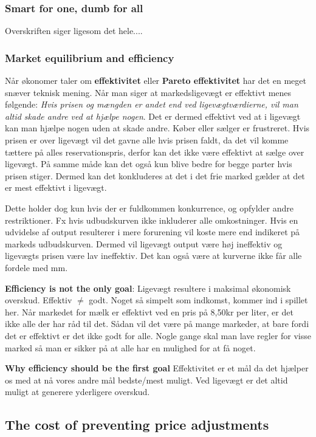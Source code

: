 \subsubsection{Smart for one, dumb for all}
Overskriften siger ligesom det hele....

\subsubsection{Market equilibrium and efficiency}
Når økonomer taler om \textbf{effektivitet} eller \textbf{Pareto effektivitet} har det en meget snæver teknisk mening. Når man siger at markedsligevægt er effektivt menes følgende: \textit{Hvis prisen og mængden er andet end ved ligevægtværdierne, vil man altid skade andre ved at hjælpe nogen}. Det er dermed effektivt ved at i ligevægt kan man hjælpe nogen uden at skade andre. Køber eller sælger er frustreret. Hvis prisen er over ligevægt vil det gavne alle hvis prisen faldt, da det vil komme tættere på alles reservationspris, derfor kan det ikke være effektivt at sælge over ligevægt. På samme måde kan det også kun blive bedre for begge parter hvis prisen stiger. Dermed kan det konkluderes at det i det frie marked gælder at det er mest effektivt i ligevægt. 

Dette holder dog kun hvis der er fuldkommen konkurrence, og opfylder andre restriktioner. Fx hvis udbudskurven ikke inkluderer alle omkostninger. Hvis en udvidelse af output resulterer i mere forurening vil koste mere end indikeret på markeds udbudskurven. Dermed vil ligevægt output være høj ineffektiv og ligevægts prisen være lav ineffektiv. Det kan også være at kurverne ikke får alle fordele med mm.

\textbf{Efficiency is not the only goal}: Ligevægt resultere i maksimal økonomisk overskud. Effektiv $\neq$ godt. Noget så simpelt som indkomst, kommer ind i spillet her. Når markedet for mælk er effektivt ved en pris på 8,50kr per liter, er det ikke alle der har råd til det. Sådan vil det være på mange markeder, at bare fordi det er effektivt er det ikke godt for alle. Nogle gange skal man lave regler for visse marked så man er sikker på at alle har en mulighed for at få noget. 

\textbf{Why efficiency should be the first goal}
Effektivitet er et mål da det hjælper os med at nå vores andre mål bedste/mest muligt. Ved ligevægt er det altid muligt at generere yderligere overskud.

\subsection{The cost of preventing price adjustments}
